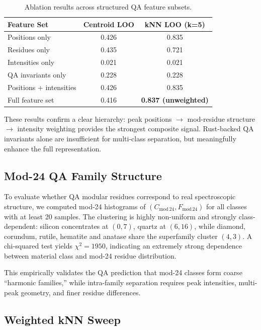 \documentclass[12pt]{article}
\begin{document}
\begin{table}[h]
\centering
\begin{tabular}{l c c}
\hline
Feature Set & Centroid LOO & kNN LOO (k=5) \\
\hline
Positions only & 0.426 & 0.835 \\
Residues only & 0.435 & 0.721 \\
Intensities only & 0.021 & 0.021 \\
QA invariants only & 0.228 & 0.228 \\
Positions + intensities & 0.426 & 0.835 \\
Full feature set & 0.416 & \textbf{0.837 (unweighted)} \\
\hline
\end{tabular}
\caption{Ablation results across structured QA feature subsets.}
\label{tab:ablation}
\end{table}

These results confirm a clear hierarchy:
peak positions $\rightarrow$ mod-residue structure $\rightarrow$ intensity weighting
provides the strongest composite signal.
Rust-backed QA invariants alone are insufficient for multi-class separation,
but meaningfully enhance the full representation.

\subsection{Mod-24 QA Family Structure}

To evaluate whether QA modular residues correspond to real spectroscopic structure,
we computed mod-24 histograms of $(C_{\mathrm{mod}\,24},F_{\mathrm{mod}\,24})$ for all classes
with at least 20 samples.
The clustering is highly non-uniform and strongly class-dependent:
silicon concentrates at $(0,7)$, quartz at $(6,16)$,
while diamond, corundum, rutile, hematite and anatase share the
superfamily cluster $(4,3)$.
A chi-squared test yields $\chi^2 = 1950$, indicating an extremely strong
dependence between material class and mod-24 residue distribution.

This empirically validates the QA prediction that mod-24 classes form
coarse ``harmonic families,''
while intra-family separation requires peak intensities,
multi-peak geometry, and finer residue differences.

\subsection{Weighted kNN Sweep}
\end{document}
